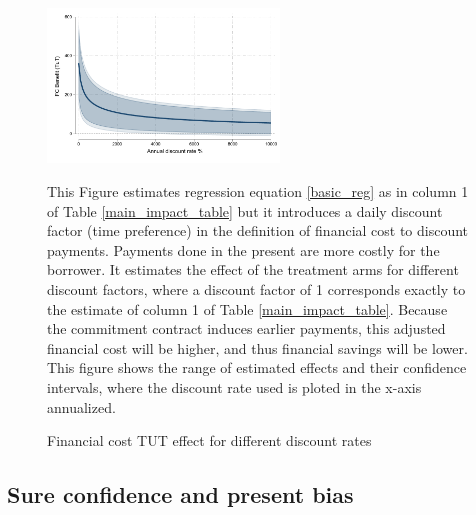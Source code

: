 \begin{figure}[H]
        \caption{Financial cost TUT effect for different discount rates}
    \label{fc_discount_rates}
    \begin{center}
        \centering
        \includegraphics[width=0.55\textwidth]{Figuras/discount_effect_tut.pdf}
    \end{center}
     \scriptsize This Figure estimates regression equation \ref{basic_reg} as in column 1 of Table \ref{main_impact_table} but it introduces a daily discount factor (time preference) in the definition of financial cost to discount payments. Payments done in the present are more costly for the borrower. It estimates the effect of the treatment arms  for different discount factors, where a discount factor of 1 corresponds exactly to the estimate of column 1 of Table \ref{main_impact_table}. Because the commitment contract induces earlier payments, this adjusted financial cost will be higher, and thus financial savings will be lower. This figure shows the range of estimated effects and their confidence intervals, where the discount rate used is ploted in the x-axis annualized.    %
\end{figure}


\vspace{.3in}
\subsection{Sure confidence and present bias}

